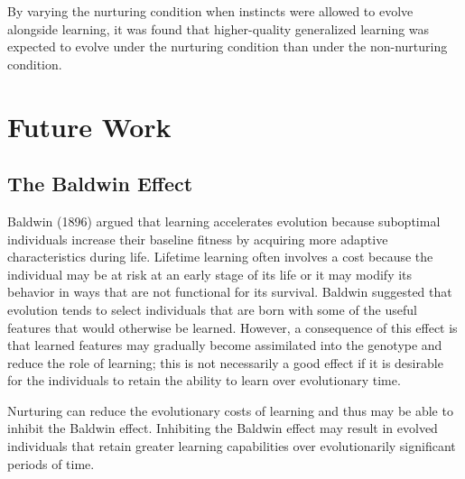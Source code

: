 \documentclass[master]{outhesis}
\begin{document}
By varying the nurturing condition when instincts were allowed to evolve alongside learning, 
it was found that higher-quality generalized learning was expected to evolve under the nurturing condition than under the non-nurturing condition.

\chapter{Future Work}

\section{The Baldwin Effect}

Baldwin (1896) argued that learning accelerates evolution because suboptimal individuals increase their baseline fitness by acquiring more adaptive characteristics during life. 
Lifetime learning often involves a cost because the individual may be at risk at an early stage of its life or it may modify its behavior in ways that are not functional for its survival.
Baldwin suggested that evolution tends to select individuals that are born with some of the useful features that would otherwise be learned.
However, a consequence of this effect is that learned features may gradually become assimilated into the genotype and reduce the role of learning;
this is not necessarily a good effect if it is desirable for the individuals to retain the ability to learn over evolutionary time. \cite{Floreano:2008wv} 

Nurturing can reduce the evolutionary costs of learning and thus may be able to inhibit the Baldwin effect.
Inhibiting the Baldwin effect may result in evolved individuals that retain greater learning capabilities over evolutionarily significant periods of time.

{}


\makebackmatter
\end{document}

